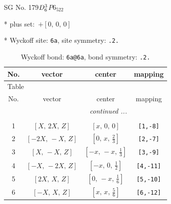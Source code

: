 \documentclass[fleqn,8pt]{jsarticle}
\begin{document}
\setcounter{MaxMatrixCols}{32}

\renewcommand{\tablename}{Table~}
\renewcommand{\figurename}{Figure~}
\begin{center}
\LARGE
SG No. 179\quad$D_{\rm 6}^{3}$\quad$P6_522$\quad[ hexagonal ]
\end{center}

* plus set:\,\,\,$+\left[ 0,\, 0,\, 0 \right]$


* Wyckoff site: {\tt 6a}, site symmetry: {\tt .2.}
\renewcommand{\arraystretch}{1.2}
\begin{longtable}{cccc}
\caption{Wyckoff bond: {\tt 6a@6a}, bond symmetry: {\tt .2.}}
 \\
 \hline \hline
No. & vector & center & mapping \\ \hline \endfirsthead

\multicolumn{3}{l}{\tablename\ \thetable{}} \\
 \hline \hline
No. & vector & center & mapping \\ \hline \endhead

 \hline \hline
\multicolumn{3}{r}{\footnotesize\it continued ...} \\ \endfoot

 \hline \hline
\multicolumn{3}{r}{} \\ \endlastfoot

1 & $\left[ X,\, 2 X,\, Z \right]$ & $\left[ x,\, 0,\, 0 \right]$ & {\tt [1,-8]} \\ \hline
2 & $\left[ - 2 X,\, - X,\, Z \right]$ & $\left[ 0,\, x,\, \frac{2}{3} \right]$ & {\tt [2,-7]} \\ \hline
3 & $\left[ X,\, - X,\, Z \right]$ & $\left[ - x,\, - x,\, \frac{1}{3} \right]$ & {\tt [3,-9]} \\ \hline
4 & $\left[ - X,\, - 2 X,\, Z \right]$ & $\left[ - x,\, 0,\, \frac{1}{2} \right]$ & {\tt [4,-11]} \\ \hline
5 & $\left[ 2 X,\, X,\, Z \right]$ & $\left[ 0,\, - x,\, \frac{1}{6} \right]$ & {\tt [5,-10]} \\ \hline
6 & $\left[ - X,\, X,\, Z \right]$ & $\left[ x,\, x,\, \frac{5}{6} \right]$ & {\tt [6,-12]} \\
\end{longtable}
\renewcommand{\arraystretch}{1.2}
\end{document}
